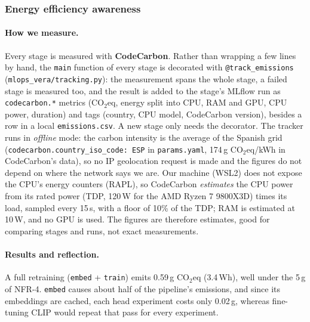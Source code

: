 \documentclass[11pt]{article}
\begin{document}
\subsubsection{Energy efficiency awareness}
\paragraph{How we measure.} Every stage is measured with \textbf{CodeCarbon}. Rather than wrapping a few lines by hand, the \texttt{main} function of every stage is decorated with \texttt{@track\_emissions} (\texttt{mlops\_vera/\allowbreak tracking.py}): the measurement spans the whole stage, a failed stage is measured too, and the result is added to the stage's MLflow run as \texttt{codecarbon.*} metrics (CO$_2$eq, energy split into CPU, RAM and GPU, CPU power, duration) and tags (country, CPU model, CodeCarbon version), besides a row in a local \texttt{emissions.csv}. A new stage only needs the decorator. The tracker runs in \emph{offline} mode: the carbon intensity is the average of the Spanish grid (\texttt{codecarbon.country\_iso\_code: ESP} in \texttt{params.yaml}, 174\,g CO$_2$eq/kWh in CodeCarbon's data), so no IP geolocation request is made and the figures do not depend on where the network says we are. Our machine (WSL2) does not expose the CPU's energy counters (RAPL), so CodeCarbon \emph{estimates} the CPU power from its rated power (TDP, 120\,W for the AMD Ryzen 7 9800X3D) times its load, sampled every 15\,s, with a floor of 10\% of the TDP; RAM is estimated at 10\,W, and no GPU is used. The figures are therefore estimates, good for comparing stages and runs, not exact measurements.

\paragraph{Results and reflection.} A full retraining (\texttt{embed} + \texttt{train}) emits 0.59\,g CO$_2$eq (3.4\,Wh), well under the 5\,g of NFR-4. \texttt{embed} causes about half of the pipeline's emissions, and since its embeddings are cached, each head experiment costs only 0.02\,g, whereas fine-tuning CLIP would repeat that pass for every experiment.
\end{document}
